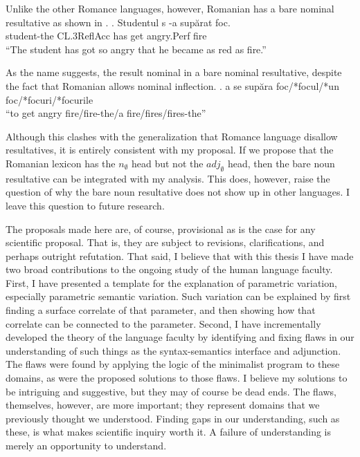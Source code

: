 \documentclass[MilwayThesis]{subfiles}
\begin{document}
Unlike the other Romance languages, however, Romanian has a bare nominal resultative as shown in \Next.
\exg. Studentul s -a sup\u{a}rat foc.\\
student-the CL.3ReflAcc has get angry.Perf fire\\
``The student has got so angry that he became as red as fire.''\parencite{farkas2011predicative}

As the name suggests, the result nominal in a bare nominal resultative, despite the fact that Romanian allows nominal inflection.
\ex. a se sup\u{a}ra foc/*focul/*un foc/*focuri/*focurile\\
``to get angry fire/fire-the/a fire/fires/fires-the'' \parencite{farkas2011predicative}

Although this clashes with the generalization that Romance language disallow resultatives, it is entirely consistent with my proposal.
If we propose that the Romanian lexicon has the $n_{\emptyset}$ head but not the $adj_{\emptyset}$ head, then the bare noun resultative can be integrated with my analysis.
This does, however, raise the question of why the bare noun resultative does not show up in other languages.
I leave this question to future research.


The proposals made here are, of course, provisional as is the case for any scientific proposal.
That is, they are subject to revisions, clarifications, and perhaps outright refutation.
That said, I believe that with this thesis I have made two broad contributions to the ongoing study of the human language faculty.
First, I have presented a template for the explanation of parametric variation, especially parametric semantic variation.
Such variation can be explained by first finding a surface correlate of that parameter, and then showing how that correlate can be connected to the parameter.
Second, I have incrementally developed the theory of the language faculty by identifying and fixing flaws in our understanding of such things as the syntax-semantics interface and adjunction.
The flaws were found by applying the logic of the minimalist program to these domains, as were the proposed solutions to those flaws.
I believe my solutions to be intriguing and suggestive, but they may of course be dead ends.
The flaws, themselves, however, are more important; they represent domains that we previously thought we understood.
Finding gaps in our understanding, such as these, is what makes scientific inquiry worth it.
A failure of understanding is merely an opportunity to understand.
\end{document}
